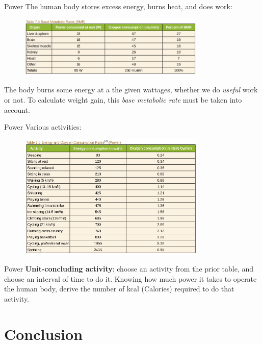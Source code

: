 \documentclass{beamer}
\begin{document}
\begin{frame}{Power}
The human body stores excess energy, burns heat, and does work:
\begin{figure}
\centering
\includegraphics[width=0.8\textwidth]{figures/body2.png}
\end{figure}
The body burns some energy at a the given wattages, whether we do \textit{useful} work or not.  To calculate weight gain, this \textit{base metabolic rate} must be taken into account.
\end{frame}

\begin{frame}{Power}
Various activities:
\begin{figure}
\centering
\includegraphics[width=0.8\textwidth]{figures/body3.png}
\end{figure}
\end{frame}

\begin{frame}{Power}
\textbf{Unit-concluding activity}: choose an activity from the prior table, and choose an interval of time to do it.  Knowing how much power it takes to operate the human body, derive the number of kcal (Calories) required to do that activity.
\end{frame}

\section{Conclusion}
\end{document}
